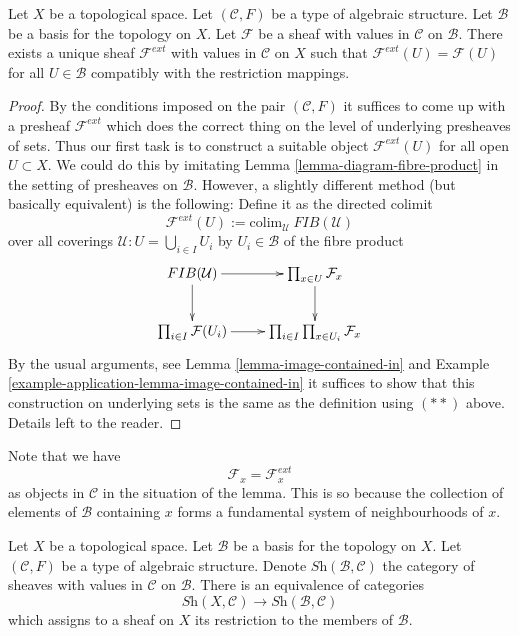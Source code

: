 \begin{lemma}
\label{lemma-extend-off-basis-structures}
Let $X$ be a topological space. Let $(\mathcal{C}, F)$ be
a type of algebraic structure.
Let $\mathcal{B}$ be a basis for the topology on $X$.
Let $\mathcal{F}$ be a sheaf with values in $\mathcal{C}$
on $\mathcal{B}$.
There exists a unique sheaf $\mathcal{F}^{ext}$ with values in $\mathcal{C}$
on $X$ such that $\mathcal{F}^{ext}(U) = \mathcal{F}(U)$
for all $U \in \mathcal{B}$ compatibly with the restriction
mappings.
\end{lemma}

\begin{proof}
By the conditions imposed on the pair $(\mathcal{C}, F)$ it
suffices to come up with a presheaf $\mathcal{F}^{ext}$
which does the correct thing on the level of underlying
presheaves of sets. Thus our first task is to construct
a suitable object $\mathcal{F}^{ext}(U)$ for all open $U \subset X$.
We could do this by imitating
Lemma \ref{lemma-diagram-fibre-product} in the setting
of presheaves on $\mathcal{B}$. However, a slightly different method
(but basically equivalent) is the following:
Define it as the directed colimit
$$
\mathcal{F}^{ext}(U)
:=
\text{colim}_{\mathcal{U}}\ FIB(\mathcal{U})
$$
over all coverings
$\mathcal{U} : U = \bigcup_{i\in I} U_i$ by $U_i \in \mathcal{B}$
of the fibre product
$$
\xymatrix{
FIB(\mathcal{U}) \ar[r] \ar[d] &
\prod\nolimits_{x\in U} \mathcal{F}_x \ar[d] \\
\prod\nolimits_{i\in I} \mathcal{F}(U_i) \ar[r] &
\prod\nolimits_{i \in I} \prod\nolimits_{x\in U_i} \mathcal{F}_x
}
$$
By the usual arguments, see Lemma \ref{lemma-image-contained-in}
and Example \ref{example-application-lemma-image-contained-in}
it suffices to show that this construction on underlying
sets is the same as the definition using $(**)$ above.
Details left to the reader.
\end{proof}

\noindent
Note that we have
$$
\mathcal{F}_x = \mathcal{F}_x^{ext}
$$
as objects in $\mathcal{C}$
in the situation of the lemma. This is so because the
collection of elements of $\mathcal{B}$ containing
$x$ forms a fundamental system of neighbourhoods of $x$.

\begin{lemma}
\label{lemma-restrict-basis-equivalence-structures}
Let $X$ be a topological space.
Let $\mathcal{B}$ be a basis for the topology on $X$.
Let $(\mathcal{C}, F)$ be a type of algebraic structure.
Denote $\textit{Sh}(\mathcal{B}, \mathcal{C})$ the category of
sheaves with values in $\mathcal{C}$ on $\mathcal{B}$.
There is an equivalence of categories
$$
\textit{Sh}(X, \mathcal{C})
\longrightarrow
\textit{Sh}(\mathcal{B}, \mathcal{C})
$$
which assigns to a sheaf on $X$ its restriction to
the members of $\mathcal{B}$.
\end{lemma}

